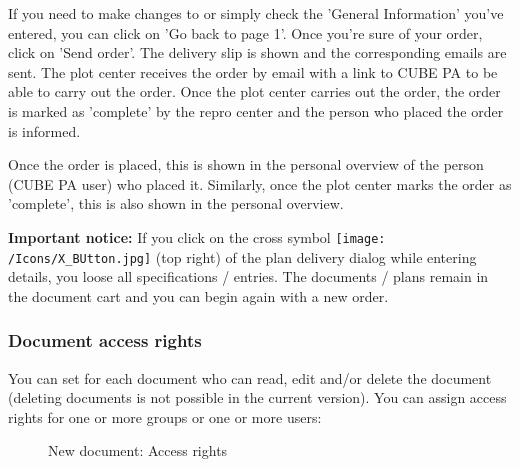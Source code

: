 \vspace{\baselineskip}

If you need to make changes to or simply check the 'General Information' you've entered, you can click on 'Go back to page 1'. Once you're sure of your order, click on 'Send order'. The delivery slip is shown and the corresponding emails are sent. The plot center receives the order by email with a link to CUBE PA to be able to carry out the order. Once the plot center carries out the order, the order is marked as 'complete' by the repro center and the person who placed the order is informed.

\vspace{\baselineskip}

Once the order is placed, this is shown in the personal overview of the person (CUBE PA user) who placed it. Similarly, once the plot center marks the order as 'complete', this is also shown in the personal overview.

\vspace{\baselineskip}

\textbf{Important notice:} If you click on the cross symbol \texttt{[image: /Icons/X\_BUtton.jpg]} (top right) of the plan delivery dialog while entering details, you loose all specifications / entries. The documents / plans remain in the document cart and you can begin again with a new order.

\subsubsection{Document access rights}
\label{bkm:Ref442869495}

You can set for each document who can read, edit and/or delete the document (deleting documents is not possible in the current version). You can assign access rights for one or more groups or one or more users:

\begin{figure}[H]
\caption{New document: Access rights}
\end{figure}

